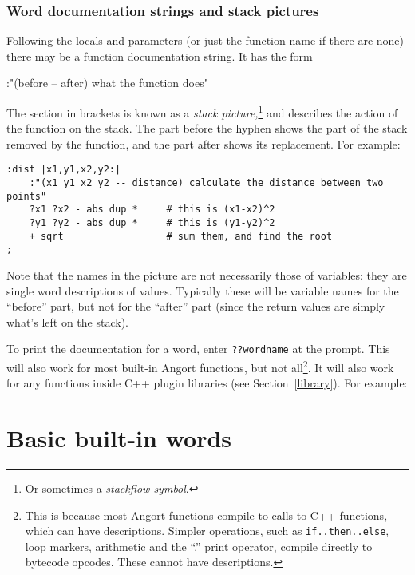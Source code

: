 \subsubsection{Word documentation strings and stack pictures}
\label{stackpic}
Following the locals and parameters (or just the function name if there
are none) there may be a function documentation string. It has the form
\begin{v}
:"(before -- after) what the function does"
\end{v}
The section in brackets is known as a \emph{stack picture,}\footnote{Or sometimes
a \emph{stackflow symbol}.} and describes
the action of the function on the stack. The part before the hyphen
shows the part of the stack removed by the function, and the part after
shows its replacement. For example:
\begin{lstlisting}
:dist |x1,y1,x2,y2:|
    :"(x1 y1 x2 y2 -- distance) calculate the distance between two points"
    ?x1 ?x2 - abs dup *     # this is (x1-x2)^2
    ?y1 ?y2 - abs dup *     # this is (y1-y2)^2
    + sqrt                  # sum them, and find the root
;
\end{lstlisting}
Note that the names in the picture are not necessarily those of variables:
they are single word descriptions of values. Typically these will be variable
names for the ``before'' part, but not for the ``after'' part (since
the return values are simply what's left on the stack).

To print the documentation for a word, enter \texttt{??wordname} at
the prompt. This will also work for most built-in Angort functions,
but not all\footnote{This is because most Angort functions compile
to calls to C++ functions, which can have descriptions. Simpler operations,
such as \texttt{if..then..else}, loop markers, arithmetic and the ``.'' print operator, compile directly to bytecode opcodes.
These cannot have descriptions.}. It will also work for any functions
inside C++ plugin libraries (see Section~\ref{library}). For example:


\section{Basic built-in words}
